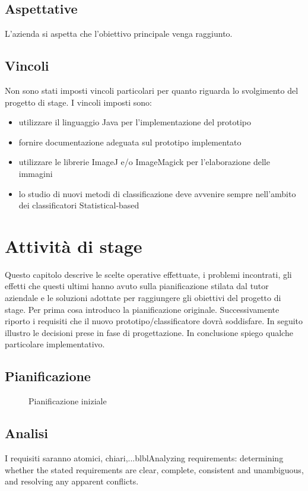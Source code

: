 \subsection{Aspettative}
\label{2.3}
L'azienda si aspetta che l'obiettivo principale venga raggiunto.
\subsection{Vincoli}
\label{2.4}
Non sono stati imposti vincoli particolari per quanto riguarda lo svolgimento del progetto di stage. I vincoli imposti sono:
\begin{itemize}
\item utilizzare il linguaggio Java per l'implementazione del prototipo
\item fornire documentazione adeguata sul prototipo implementato
\item utilizzare le librerie ImageJ e/o ImageMagick per l'elaborazione delle immagini
\item lo studio di nuovi metodi di classificazione deve avvenire sempre nell'ambito dei classificatori Statistical-based
\end{itemize}

\newpage

\section{Attività di stage}
\label{3.0}
Questo capitolo descrive le scelte operative effettuate, i problemi incontrati, gli effetti che questi ultimi hanno avuto sulla pianificazione stilata dal tutor aziendale e le soluzioni adottate per raggiungere gli obiettivi del progetto di stage. Per prima cosa introduco la pianificazione originale. Successivamente riporto i requisiti che il nuovo prototipo/classificatore dovrà soddisfare. In seguito illustro le decisioni prese in fase di progettazione. In conclusione spiego qualche particolare implementativo.
\subsection{Pianificazione}
\label{3.1}

\begin{figure}[H]
\centering
\noindent{}
\caption{Pianificazione iniziale}
\end{figure}

\subsection{Analisi}
\label{3.2}
I requisiti saranno atomici, chiari,...blblAnalyzing requirements: determining whether the stated requirements are clear, complete, consistent and unambiguous, and resolving any apparent conflicts.
